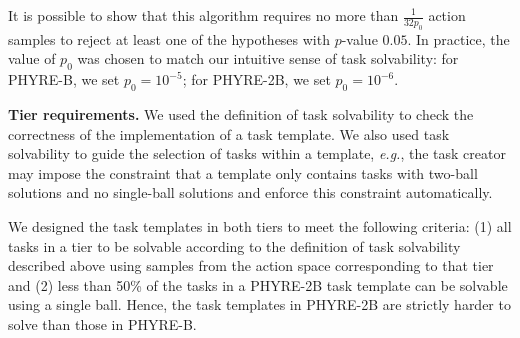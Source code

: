 \documentclass{article}
\begin{document}
It is possible to show that this algorithm requires no more than $\frac{1}{32p_0}$ action samples to reject at least one of the hypotheses with $p$-value $0.05$. In practice, the value of $p_0$ was chosen to match our intuitive sense of task solvability: for PHYRE-B, we set $p_0=10^{-5}$; for PHYRE-2B, we set $p_0=10^{-6}$.

\noindent\textbf{Tier requirements.} We used the definition of task solvability to check the correctness of the implementation of a task template. We also used task solvability to guide the selection of tasks within a template, \emph{e.g.}, the task creator may impose the constraint that a template only contains tasks with two-ball solutions and no single-ball solutions and enforce this constraint automatically.

We designed the task templates in both tiers to meet the following criteria: (1) all tasks in a tier to be solvable according to the definition of task solvability described above using samples from the action space corresponding to that tier and (2) less than 50\% of the tasks in a PHYRE-2B task template can be solvable using a single ball. Hence, the task templates in PHYRE-2B are strictly harder to solve than those in PHYRE-B.
\end{document}

